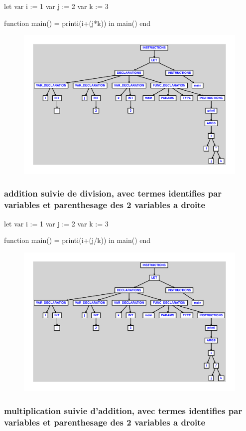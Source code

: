 \documentclass{article}
\begin{document}
\begin{verbatimtab}
let
	var i := 1
	var j := 2
	var k := 3

	function main() = printi(i+(j*k))
in main() end
\end{verbatimtab}
\begin{figure}[H]\centering\includegraphics[max width=\textwidth]{ast/ast_113.pdf}\end{figure}\subsubsection{addition suivie de division, avec termes identifies par variables et parenthesage des 2 variables a droite}
\begin{verbatimtab}
let
	var i := 1
	var j := 2
	var k := 3

	function main() = printi(i+(j/k))
in main() end
\end{verbatimtab}
\begin{figure}[H]\centering\includegraphics[max width=\textwidth]{ast/ast_114.pdf}\end{figure}\subsubsection{multiplication suivie d'addition, avec termes identifies par variables et parenthesage des 2 variables a droite}
\end{document}
